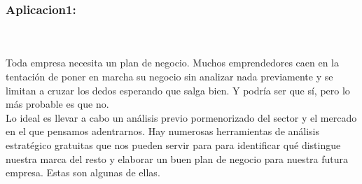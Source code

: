 \subsubsection{Aplicacion1: }\label{sec:nada2}  

\begin{center}
\caption\textbf{HERRAMIENTAS DE BUSINESS ANALITYCS}
\end{center}
\\
\\
Toda empresa necesita un plan de negocio. Muchos emprendedores caen en la tentación de poner en marcha su negocio sin analizar nada previamente y se limitan a cruzar los dedos esperando que salga bien. Y podría ser que sí, pero lo más probable es que no.\\
Lo ideal es llevar a cabo un análisis previo pormenorizado del sector y el mercado en el que pensamos adentrarnos. Hay numerosas herramientas de análisis estratégico gratuitas que nos pueden servir para para identificar qué distingue nuestra marca del resto y elaborar un buen plan de negocio para nuestra futura empresa. Estas son algunas de ellas.  
\\
